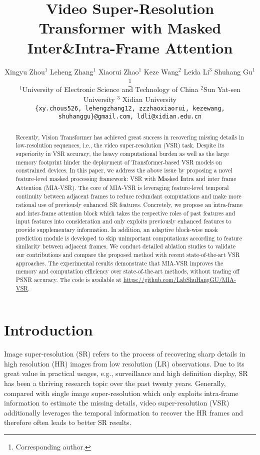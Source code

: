\documentclass[10pt,twocolumn,letterpaper]{article}
\title{Video Super-Resolution Transformer with Masked Inter\&Intra-Frame Attention}
\author{\hspace{-0.5cm}
Xingyu Zhou$^1$ Leheng Zhang$^1$
Xiaorui Zhao$^1$  Keze Wang$^2$ Leida Li$^3$ Shuhang Gu$^1$\thanks{Corresponding author.}\\%
\hspace{-0.5cm}
$^1$University of Electronic Science and Technology of China \hspace{0pt}
$^2$Sun Yat-sen University \hspace{0pt}
$^3$ Xidian University\\
\hspace{-0.5cm}
{\tt\small \{xy.chous526, lehengzhang12, zzzhaoxiaorui, kezewang, shuhanggu\}@gmail.com, ldli@xidian.edu.cn}}
\begin{document}
\maketitle
\begin{abstract}
Recently, Vision Transformer has achieved great success in recovering missing details in low-resolution sequences, i.e., the video super-resolution (VSR) task.
%
Despite its superiority in VSR accuracy, the heavy computational burden as well as the large memory footprint hinder the deployment of Transformer-based VSR models on constrained devices.
%
In this paper, we address the above issue by proposing a novel feature-level masked processing framework: VSR with \textbf{M}asked \textbf{I}ntra and inter frame \textbf{A}ttention (MIA-VSR).
%
The core of MIA-VSR is leveraging feature-level temporal continuity between adjacent frames to reduce redundant computations and make more rational use of previously enhanced SR features.
%
Concretely, we propose an intra-frame and inter-frame attention block which takes the respective roles of past features and input
features into consideration and only exploits previously enhanced features to provide supplementary information.
In addition, an adaptive block-wise mask prediction module is developed to skip unimportant computations according to feature similarity between adjacent frames.
%
We conduct detailed ablation studies to validate our contributions and compare the proposed method with recent state-of-the-art VSR approaches.
%
The experimental results demonstrate that MIA-VSR improves
the memory and computation efficiency over state-of-the-art methods, without trading off PSNR accuracy. The code is available at \url{https://github.com/LabShuHangGU/MIA-VSR}.
\end{abstract} 
\section{Introduction}
\label{sec:intro}
Image super-resolution (SR) refers to the process of recovering sharp details in high resolution (HR) images from low resolution (LR) observations.
%
Due to its great value in practical usages, e.g., surveillance and high deﬁnition display, SR has been a thriving research topic over the past twenty years.
%
Generally, compared with single image super-resolution which only exploits intra-frame information to estimate the missing details, video super-resolution (VSR) additionally leverages the temporal information to recover the HR frames and therefore often leads to better SR results.
%
\end{document}
